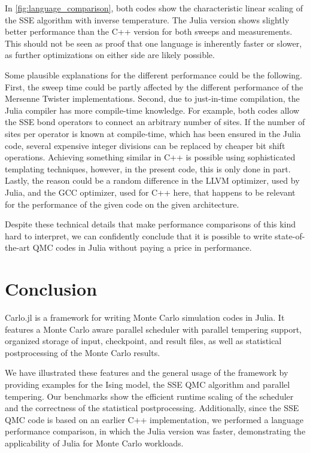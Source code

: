 \documentclass{SciPost}
\begin{document}
In \cref{fig:language_comparison}, both codes show the characteristic linear scaling of the SSE algorithm with inverse temperature. The Julia version shows slightly better performance than the C++ version for both sweeps and measurements. This should not be seen as proof that one language is inherently faster or slower, as further optimizations on either side are likely possible.

Some plausible explanations for the different performance could be the following. First, the sweep time could be partly affected by the different performance of the Mersenne Twister implementations. Second, due to just-in-time compilation, the Julia compiler has more compile-time knowledge. For example, both codes allow the SSE bond operators to connect an arbitrary number of sites. If the number of sites per operator is known at compile-time, which has been ensured in the Julia code, several expensive integer divisions can be replaced by cheaper bit shift operations. Achieving something similar in C++ is possible using sophisticated templating techniques, however, in the present code, this is only done in part. Lastly, the reason could be a random difference in the LLVM optimizer, used by Julia, and the GCC optimizer, used for C++ here, that happens to be relevant for the performance of the given code on the given architecture.

Despite these technical details that make performance comparisons of this kind hard to interpret, we can confidently conclude that it is possible to write state-of-the-art QMC codes in Julia without paying a price in performance.
\section{Conclusion}
\label{sec:conclusion}
Carlo.jl is a framework for writing Monte Carlo simulation codes in Julia. It features a Monte Carlo aware parallel scheduler with parallel tempering support, organized storage of input, checkpoint, and result files, as well as statistical postprocessing of the Monte Carlo results.

We have illustrated these features and the general usage of the framework by providing examples for the Ising model, the SSE QMC algorithm and parallel tempering. Our benchmarks show the efficient runtime scaling of the scheduler and the correctness of the statistical postprocessing. Additionally, since the SSE QMC code is based on an earlier C++ implementation, we performed a language performance comparison, in which the Julia version was faster, demonstrating the applicability of Julia for Monte Carlo workloads.
\end{document}
